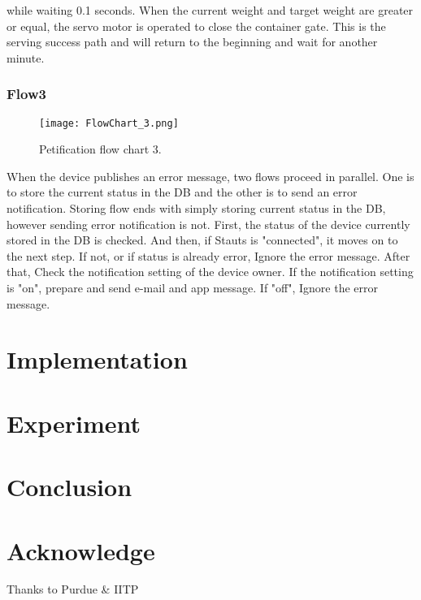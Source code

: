 \documentclass[conference]{IEEEtran}
\begin{document}
while waiting 0.1 seconds. When the current weight and target weight are greater or equal, the servo motor is operated to close the container gate. This is the serving success path and will return to the beginning and wait for another minute.

\hfill \break
\subsubsection{Flow3}
\begin{figure}[htbp]
\centerline{\texttt{[image: FlowChart\_3.png]}}
\caption{Petification flow chart 3.}
\label{fig}
\end{figure}
When the device publishes an error message, two flows proceed in parallel. One is to store the current status in the DB and the other is to send an error notification.
Storing flow ends with simply storing current status in the DB, however sending error notification is not.
First, the status of the device currently stored in the DB is checked. And then, if Stauts is "connected", it moves on to the next step. If not, or if status is already error, Ignore the error message. After that, Check the notification setting of the device owner. If the notification setting is "on", prepare and send e-mail and app message. If "off", Ignore the error message. 






\section{Implementation}

\section{Experiment}
\section{Conclusion}

\section*{Acknowledge}
Thanks to Purdue \& IITP
\end{document}

